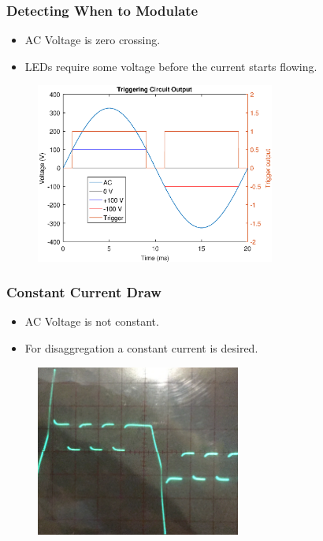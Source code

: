 \documentclass{beamer}
\begin{document}
	\begin{frame}\frametitle{Detecting When to Modulate}

		\begin{itemize}

			\item AC Voltage is zero crossing.

			\item LEDs require some voltage before the current starts flowing.

		\end{itemize}
		

		\begin{figure}
			\centering
			\includegraphics[width=0.7\textwidth]{ac-wave-triggering.eps}
		\end{figure}
		
		
	\end{frame}



	\begin{frame}\frametitle{Constant Current Draw}


		\begin{itemize}

			\item AC Voltage is not constant.

			\item For disaggregation a constant current is desired.

		\end{itemize}

		\begin{figure}
			\centering
			\includegraphics[width=0.6\textwidth]{../chapters/hardware-chapters/AC/ac-modulator/custom-hardware/ac-current-source/current-source-measurement-cropped.png}
		\end{figure}


	\end{frame}
\end{document}
